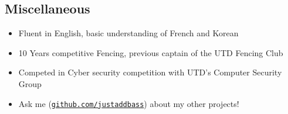 \documentclass[line,margin]{res}
\begin{document}
\begin{resume}
\vspace{-4pt}
\section{Miscellaneous}
\vspace{22pt}
	\begin{itemize} \itemsep -2pt
	\item Fluent in English, basic understanding of French and Korean
	\item 10 Years competitive Fencing, previous captain of the UTD Fencing Club
	\item Competed in Cyber security competition with UTD's Computer Security Group
	\item Ask me (\href{https://github.com/justaddbass}{\texttt{github.com/justaddbass}}) about my other projects!
	\end{itemize}

\end{resume}
\end{document}
